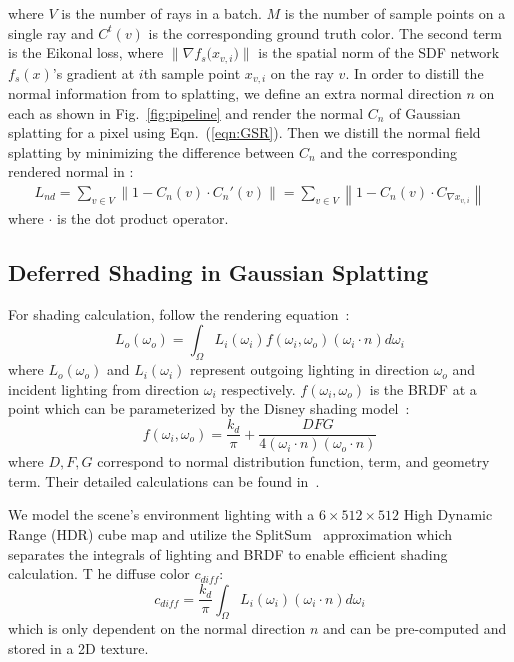 where $V$ is the number of rays in a batch. 
$M$ is the number of sample points on a single ray and $C^{t}(v)$ is the corresponding ground truth color. 
The second term is the Eikonal loss, where $\|\nabla f_s({x_{v, i})} \|$ is the spatial norm of the SDF network $f_s(x)$'s gradient at  $i$th sample point $x_{v, i}$ on the ray $v$.
In order to distill the normal information from \neusbranch to  splatting, we define an extra normal direction $n$ on each  as shown in Fig.~\ref{fig:pipeline} and render the normal $C_n$ of Gaussian splatting for a pixel using Eqn.~(\ref{eqn:GSR}). 
Then we distill the normal field  splatting by minimizing the difference between $C_n$ and the corresponding rendered normal in \neusbranch:
\begin{equation}
\label{eqn:L_nd}
\begin{aligned}
     L_{nd} = \sum_{v \in V} \left\|1 - C_n(v) \cdot C_n'(v)\right\| = \sum_{v \in V} \left\|1 - C_n(v) \cdot C_{\nabla x_{v,i}} \right\|
\end{aligned}
\end{equation}
where $\cdot$ is the dot product operator. 

\subsection{Deferred Shading in Gaussian Splatting}
\label{subsec:DS_GS}
For shading calculation,  follow the rendering equation~\cite{RenderingEquation}:
\begin{equation}
\label{eqn:rendering_eqn}
    L_o(\omega_{o}) = \int_{\Omega} L_i(\omega_{i}) f(\omega_{i}, \omega_{o}) (\omega_{i} \cdot n) d \omega_i
\end{equation}
where $L_o(\omega_{o})$ and $L_i(\omega_{i})$ represent outgoing lighting in direction $\omega_{o}$ and incident lighting from direction $\omega_{i}$ respectively. 
$f(\omega_{i}, \omega_{o})$ is the BRDF 
at a point which can be parameterized by the Disney shading model~\cite{DisneyBRDF}:
\begin{equation}
    f(\omega_{i}, \omega_{o}) = \frac{k_d}{\pi} + \frac{DFG}{4(\omega_{i} \cdot n)(\omega_{o} \cdot n)}
\end{equation}
where $D, F, G$ correspond to normal distribution function,  term, and geometry term. 
Their detailed calculations can be found in~\cite{microfacet}. 

We model the scene's environment lighting with a $6 \times 512\times 512$ High Dynamic Range (HDR) cube map and utilize the SplitSum~\cite{SplitSum} approximation which separates the integrals of lighting and BRDF to enable efficient shading calculation. 
T   he diffuse color $c_{diff}$:
\begin{equation}
    c_{diff} = \frac{k_d}{\pi} \int_{\Omega} L_i(\omega_{i}) (\omega_{i} \cdot n) d \omega_i
\end{equation}
which is only dependent on the normal direction $n$ and can be pre-computed and stored in a 2D texture. 

